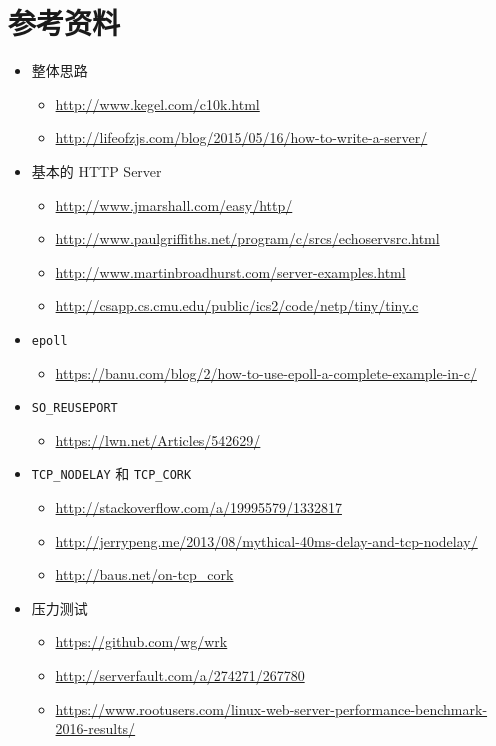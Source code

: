 \documentclass[a4paper]{article}
\providecommand{\tightlist}{\setlength{\itemsep}{0pt}\setlength{\parskip}{0pt}}
\begin{document}
\section{参考资料}
\begin{itemize}
\tightlist
\item
  整体思路

  \begin{itemize}
  \tightlist
  \item
    \url{http://www.kegel.com/c10k.html}
  \item
    \url{http://lifeofzjs.com/blog/2015/05/16/how-to-write-a-server/}
  \end{itemize}
\item
  基本的 HTTP Server

  \begin{itemize}
  \tightlist
  \item
    \url{http://www.jmarshall.com/easy/http/}
  \item
    \url{http://www.paulgriffiths.net/program/c/srcs/echoservsrc.html}
  \item
    \url{http://www.martinbroadhurst.com/server-examples.html}
  \item
    \url{http://csapp.cs.cmu.edu/public/ics2/code/netp/tiny/tiny.c}
  \end{itemize}
\item
  \texttt{epoll}

  \begin{itemize}
  \tightlist
  \item
    \url{https://banu.com/blog/2/how-to-use-epoll-a-complete-example-in-c/}
  \end{itemize}
\item
  \texttt{SO\_REUSEPORT}

  \begin{itemize}
  \tightlist
  \item
    \url{https://lwn.net/Articles/542629/}
  \end{itemize}
\item
  \texttt{TCP\_NODELAY} 和 \texttt{TCP\_CORK}

  \begin{itemize}
  \tightlist
  \item
    \url{http://stackoverflow.com/a/19995579/1332817}
    
  \item
    \url{http://jerrypeng.me/2013/08/mythical-40ms-delay-and-tcp-nodelay/}
  \item
    \url{http://baus.net/on-tcp_cork}
  \end{itemize}
\item
  压力测试

  \begin{itemize}
  \tightlist
  \item
    \url{https://github.com/wg/wrk}
  \item
    \url{http://serverfault.com/a/274271/267780}
  \item
    \url{https://www.rootusers.com/linux-web-server-performance-benchmark-2016-results/}
  \end{itemize}
\end{itemize}
\end{document}
